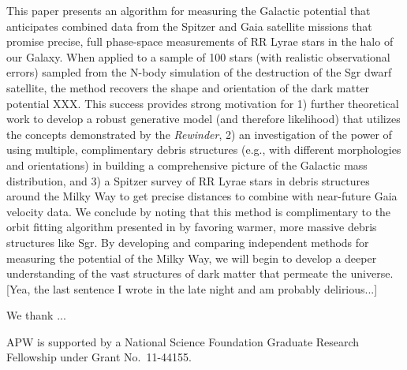 \documentclass[preprint]{aastex}
\begin{document}
This paper presents an algorithm for measuring the Galactic potential
that anticipates combined data from the Spitzer and Gaia satellite
missions that promise precise, full phase-space measurements of RR
Lyrae stars in the halo of our Galaxy. When applied to a sample of 100
stars (with realistic observational errors) sampled from the
\cite{law10} N-body simulation of the destruction of the Sgr dwarf
satellite, the method recovers the shape and orientation of the dark
matter potential XXX. This success provides strong motivation for 1)
further theoretical work to develop a robust generative model (and therefore likelihood) that utilizes the concepts demonstrated by the \emph{Rewinder}, 2) an investigation of the power of
using multiple, complimentary debris structures (e.g., with different
morphologies and orientations) in building a comprehensive picture of
the Galactic mass distribution, and 3) a Spitzer survey of RR Lyrae
stars in debris structures around the Milky Way to get precise
distances to combine with near-future Gaia velocity data. We conclude by noting that this method is complimentary to the orbit fitting algorithm presented in \citet{sanders13b} by favoring warmer, more massive debris structures like Sgr. By developing and comparing independent methods for measuring the potential of the Milky Way, we will begin to develop a deeper understanding of the vast structures of dark matter that permeate the universe. [Yea, the last sentence I wrote in the late night and am probably delirious...]

\acknowledgments
We thank ...

APW is supported by a National Science Foundation Graduate Research
Fellowship under Grant No.\ 11-44155.



\end{document}
